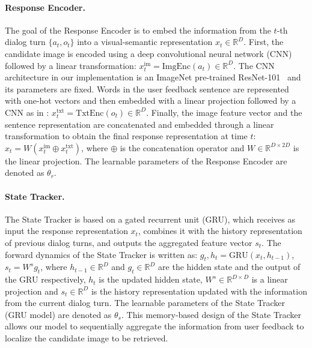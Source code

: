 \paragraph{Response Encoder.} 
The goal of the Response Encoder is to embed the information from the $t$-th dialog turn 
$\{a_{t},o_{t}\}$ into a visual-semantic representation $x_t \in \mathbb{R}^D$. First, the candidate image is encoded using a deep convolutional neural network (CNN) followed by a linear transformation: $x_t^{\textrm{im}} = \textrm{ImgEnc}(a_t) \in \mathbb{R}^{D}$. The CNN architecture in our implementation is an ImageNet pre-trained ResNet-101~\cite{He2015} and its parameters are fixed. 
Words in the user feedback sentence are represented with one-hot vectors and then embedded with a linear projection followed by a CNN as in \cite{kim2014convolutional}: 
$x_t^{\textrm{txt}} = \textrm{TxtEnc}(o_t) \in \mathbb{R}^{D}$. Finally, the image feature vector and 
the sentence representation 
are concatenated and embedded through a linear transformation to obtain the final 
response representation at time $t$: 
$x_{t}=W(x^{\textrm{im} }_{t} \oplus x^{\textrm{txt}}_{t} )$, 
where $\oplus$ is the concatenation operator and $W \in \mathbb{R}^{D \times 2D}$ is the linear 
projection. The learnable parameters of the Response Encoder are denoted as $\theta_{r}$. 

\paragraph{State Tracker.} The State Tracker is based on a gated recurrent unit (GRU), %
which receives as input the response representation $x_t$, combines it with
the history representation of previous dialog turns, and outputs the 
aggregated feature vector $s_t$.
The forward dynamics of the State Tracker is written as: $g_{t}, h_{t}= \textrm{GRU} (x_{t}, h_{t-1})$, $s_{t} = W^{s} g_{t}$, 
where $h_{t-1} \in \mathbb{R}^{D}$ and $g_{t} \in \mathbb{R}^{D}$ are the hidden 
state and the output of the GRU respectively, $h_{t}$ is the updated hidden state,
$W^{s} \in \mathbb{R}^{D \times D}$ is a linear projection and $s_t\in \mathbb{R}^{D}$ is the history representation updated with the 
information from the current dialog turn. %
The learnable parameters of the State Tracker (GRU model) are denoted as $\theta_{s}$. 
This memory-based design of the State Tracker allows our model to sequentially aggregate the information from user feedback to localize the candidate image
to be retrieved.

